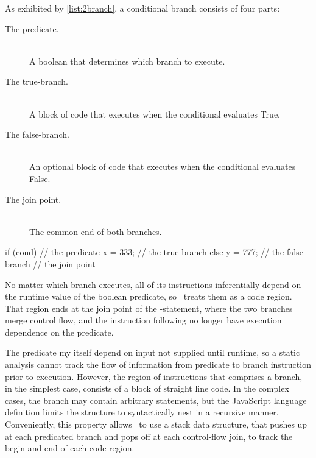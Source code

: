 As exhibited by \autoref{list:2branch}, a conditional branch consists of four parts:
\begin{description}
  \item [The predicate.] \hfill \\
    A boolean that determines which branch to execute.
  \item [The true-branch.] \hfill \\
    A block of code that executes when the conditional evaluates True.
  \item [The false-branch.] \hfill \\
    An optional block of code that executes when the conditional evaluates False.
  \item [The join point.] \hfill \\
    The common end of both branches.
\end{description}

\begin{jscode}
    if (cond) {      // the predicate
        x = 333;     // the true-branch
    } else {
        y = 777;     // the false-branch
    }
    // the join point
\end{jscode}

No matter which branch executes, all of its instructions inferentially depend on the runtime value of the boolean predicate, so \FlowCore\ treats them as a code region.
That region ends at the join point of the -statement, where the two branches merge control flow, and the instruction following no longer have execution dependence on the predicate.

The predicate my itself depend on input not supplied until runtime, so a static analysis cannot track the flow of information from predicate to branch instruction prior to execution.
However, the region of instructions that comprises a branch, in the simplest case, consists of a block of straight line code.
In the complex cases, the branch may contain arbitrary statements, but the JavaScript language definition limits the structure to syntactically nest in a recursive manner.
Conveniently, this property allows \FlowCore\ to use a stack data structure, that pushes up at each predicated branch and pops off at each control-flow join, to track the begin and end of each code region.

